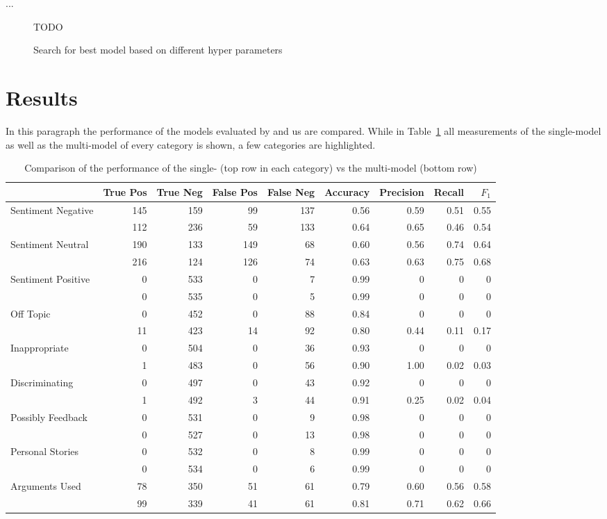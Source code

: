 \documentclass[11pt,a4paper]{article}
\begin{document}
...
\begin{figure}[h!]
	\centering
	TODO
	\caption{Search for best model based on different hyper parameters}
	\label{fig:hyper_params}
\end{figure}


\section{Results}
In this paragraph the performance of the models evaluated by  and us are compared.
While in Table~\ref{tab:results} all measurements of the single-model as well as the multi-model of every category is shown, a few categories are highlighted.

\begin{table}
	\centering\small
	\begin{tabular}{l r r r r r r r r}
		& True Pos & True Neg & False Pos & False Neg & Accuracy & Precision & Recall & $F_1$ \\
		\hline
		Sentiment Negative & 145 & 159 & 99 & 137 & 0.56 & 0.59 & 0.51 & 0.55 \\
		& 112 & 236 & 59 & 133 & 0.64 & 0.65 & 0.46 & 0.54 \\
		\hline
		Sentiment Neutral & 190 & 133 & 149 & 68 & 0.60 & 0.56 & 0.74 & 0.64 \\
		& 216 & 124 & 126 & 74 & 0.63 & 0.63 & 0.75 & 0.68 \\
		\hline
		Sentiment Positive & 0 & 533 & 0 & 7 & 0.99 & 0 & 0 & 0 \\
		& 0 & 535 & 0 & 5 & 0.99 & 0 & 0 & 0 \\
		\hline
		Off Topic & 0 & 452 & 0 & 88 & 0.84 & 0 & 0 & 0 \\
		& 11 & 423 & 14 & 92 & 0.80 & 0.44 & 0.11 & 0.17 \\
		\hline
		Inappropriate & 0 & 504 & 0 & 36 & 0.93 & 0 & 0 & 0 \\
		& 1 & 483 & 0 & 56 & 0.90 & 1.00 & 0.02 & 0.03 \\
		\hline
		Discriminating & 0 & 497 & 0 & 43 & 0.92 & 0 & 0 & 0 \\
		& 1 & 492 & 3 & 44 & 0.91 & 0.25 & 0.02 & 0.04 \\
		\hline
		Possibly Feedback & 0 & 531 & 0 & 9 & 0.98 & 0 & 0 & 0 \\
		& 0 & 527 & 0 & 13 & 0.98 & 0 & 0 & 0 \\
		\hline
		Personal Stories & 0 & 532 & 0 & 8 & 0.99 & 0 & 0 & 0 \\
		& 0 & 534 & 0 & 6 & 0.99 & 0 & 0 & 0 \\
		\hline
		Arguments Used & 78 & 350 & 51 & 61 & 0.79 & 0.60 & 0.56 & 0.58\\
		& 99 & 339 & 41 & 61 & 0.81 & 0.71 & 0.62 & 0.66 \\
	\end{tabular}
	\caption{Comparison of the performance of the single- (top row in each category) vs the multi-model (bottom row)}
	\label{tab:results}
\end{table}
\end{document}
